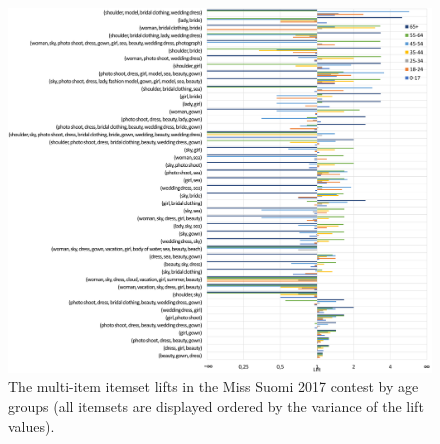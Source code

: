 \documentclass[english]{tktltiki}
\begin{document}
\clearpage
{}
\begin{figure}[H]
    \begin{center}
        \includegraphics[width=1.25\textwidth,center]{Images/itemset_lifts-age_groups-Miss_Suomi-multi_itemsets.png}
        The multi-item itemset lifts in the Miss Suomi 2017 contest by age groups (all itemsets are displayed ordered by the variance of the lift values).
    \end{center}
\end{figure}
\end{document}

